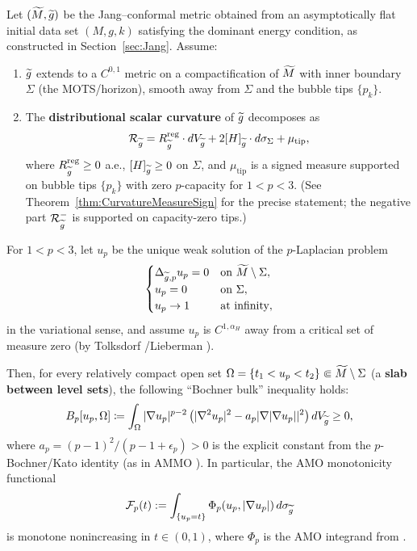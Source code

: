 \begin{theorem}\label{thm:DistrBochner}
Let $(\widetilde{M}, \widetilde{g})$ be the Jang--conformal metric obtained from an asymptotically flat initial data set $(M, g, k)$ satisfying the dominant energy condition, as constructed in Section~\ref{sec:Jang}. Assume:
\begin{enumerate}
    \item $\widetilde{g}$ extends to a $C^{0,1}$ metric on a compactification of $\widetilde{M}$ with inner boundary $\Sigma$ (the MOTS/horizon), smooth away from $\Sigma$ and the bubble tips $\{p_k\}$.
    \item The \textbf{distributional scalar curvature} of $\widetilde{g}$ decomposes as
    \begin{equation}\label{eq:DistrScalarCurvDecomp}
        \mathcal{R}_{\widetilde{g}} = R_{\widetilde{g}}^{\mathrm{reg}} \cdot dV_{\widetilde{g}} + 2[H]_{\widetilde{g}} \cdot d\sigma_\Sigma + \mu_{\mathrm{tip}},
    \end{equation}
    where $R_{\widetilde{g}}^{\mathrm{reg}} \ge 0$ a.e., $[H]_{\widetilde{g}} \ge 0$ on $\Sigma$, and $\mu_{\mathrm{tip}}$ is a signed measure supported on bubble tips $\{p_k\}$ with zero $p$-capacity for $1 < p < 3$. (See Theorem~\ref{thm:CurvatureMeasureSign} for the precise statement; the negative part $\mathcal{R}_{\widetilde{g}}^-$ is supported on capacity-zero tips.)
\end{enumerate}

For $1 < p < 3$, let $u_p$ be the unique weak solution of the $p$-Laplacian problem
\begin{equation}\label{eq:pCapacitaryProblem}
    \begin{cases}
        \Delta_{\widetilde{g}, p} u_p = 0 & \text{on } \widetilde{M} \setminus \Sigma, \\
        u_p = 0 & \text{on } \Sigma, \\
        u_p \to 1 & \text{at infinity},
    \end{cases}
\end{equation}
in the variational sense, and assume $u_p$ is $C^{1,\alpha_H}$ away from a critical set of measure zero (by Tolksdorf \cite{tolksdorf1984}/Lieberman \cite{lieberman1988}).

Then, for every relatively compact open set $\Omega = \{t_1 < u_p < t_2\} \Subset \widetilde{M} \setminus \Sigma$ (a \textbf{slab between level sets}), the following ``Bochner bulk'' inequality holds:
\begin{equation}\label{eq:BochnerBulkIneq}
    B_p[u_p, \Omega] \coloneqq \int_\Omega |\nabla u_p|^{p-2} \left( |\nabla^2 u_p|^2 - a_p |\nabla|\nabla u_p||^2 \right) dV_{\widetilde{g}} \ge 0,
\end{equation}
where $a_p = (p-1)^2/(p-1+\epsilon_p) > 0$ is the explicit constant from the $p$-Bochner/Kato identity (as in AMMO \cite{amo2024}). In particular, the AMO monotonicity functional
\begin{equation}\label{eq:AMOMonotonicity}
    \mathcal{F}_p(t) := \int_{\{u_p = t\}} \Phi_p(u_p, |\nabla u_p|) \, d\sigma_{\widetilde{g}}
\end{equation}
is monotone nonincreasing in $t \in (0, 1)$, where $\Phi_p$ is the AMO integrand from \cite{amo2024}.
\end{theorem}

